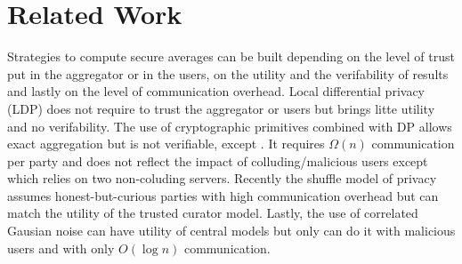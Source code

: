 
\section{Related Work}
\label{sec:related}

Strategies to compute secure averages can be built depending on the level of trust put in the aggregator or in the users, on the utility and the verifability of results and lastly on the level of communication overhead.
Local differential privacy (LDP) \cite{Kasiviswanathan2008,d13,kairouz2015secure,Kairouz2016a,discrete_dis_local} does not require to trust the aggregator or users but brings litte utility and no verifability. The use of cryptographic primitives combined with DP \cite{pmlr-v139-kairouz21a,skellam} allows exact aggregation but is not verifiable, except \cite{Dwork2006ourselves}. It requires $\Omega(n)$ communication per party and does not reflect the impact of colluding/malicious users except \cite{Jayaraman2018} which relies on two non-coluding servers. Recently the shuffle model of privacy \cite{Cheu2019,amp_shuffling,Hartmann2019,Balle2020,Ghazi2020ICML} assumes honest-but-curious parties with high communication overhead but can match the utility of the trusted curator model. Lastly, the use of correlated Gausian noise \cite{imtiaz2021distributed, sabater2021accurate} can have utility of central models but only \cite{sabater2021accurate} can do it with malicious users and with only $O(\log n)$ communication.
